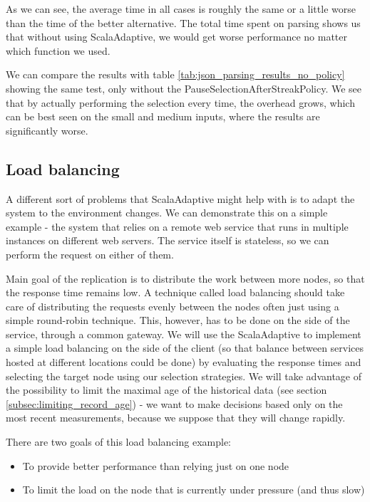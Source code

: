 As we can see, the average time in all cases is roughly the same or a little worse than the time of the better alternative. The total time spent on parsing shows us that without using ScalaAdaptive, we would get worse performance no matter which function we used.

We can compare the results with table \ref{tab:json_parsing_results_no_policy} showing the same test, only without the PauseSelectionAfterStreakPolicy. We see that by actually performing the selection every time, the overhead grows, which can be best seen on the small and medium inputs, where the results are significantly worse.


\subsection{Load balancing}

A different sort of problems that ScalaAdaptive might help with is to adapt the system to the environment changes. We can demonstrate this on a simple example - the system that relies on a remote web service that runs in multiple instances on different web servers. The service itself is stateless, so we can perform the request on either of them. 

Main goal of the replication is to distribute the work between more nodes, so that the response time remains low. A technique called load balancing should take care of distributing the requests evenly between the nodes often just using a simple round-robin technique. This, however, has to be done on the side of the service, through a common gateway. We will use the ScalaAdaptive to implement a simple load balancing on the side of the client (so that balance between services hosted at different locations could be done) by evaluating the response times and selecting the target node using our selection strategies. We will take advantage of the possibility to limit the maximal age of the historical data (see section \ref{subsec:limiting_record_age}) - we want to make decisions based only on the most recent measurements, because we suppose that they will change rapidly.

There are two goals of this load balancing example:

\begin{itemize}
	\item To provide better performance than relying just on one node
	\item To limit the load on the node that is currently under pressure (and thus slow)
\end{itemize}

